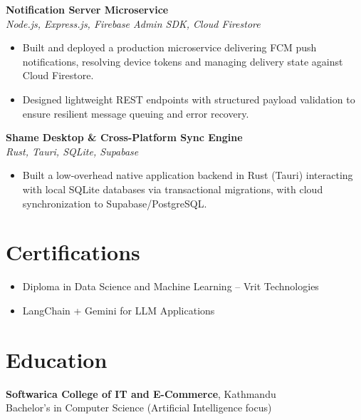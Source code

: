 \documentclass[a4paper,10pt]{article}
\begin{document}
\vspace{3pt}
\textbf{Notification Server Microservice} \\
\textit{Node.js, Express.js, Firebase Admin SDK, Cloud Firestore}
\begin{itemize}
    \item Built and deployed a production microservice delivering FCM push notifications, resolving device tokens and managing delivery state against Cloud Firestore.
    \item Designed lightweight REST endpoints with structured payload validation to ensure resilient message queuing and error recovery.
\end{itemize}

\vspace{3pt}
\textbf{Shame Desktop \& Cross-Platform Sync Engine} \\
\textit{Rust, Tauri, SQLite, Supabase}
\begin{itemize}
    \item Built a low-overhead native application backend in Rust (Tauri) interacting with local SQLite databases via transactional migrations, with cloud synchronization to Supabase/PostgreSQL.
\end{itemize}

\section*{Certifications}
\begin{itemize}
    \item Diploma in Data Science and Machine Learning -- Vrit Technologies
    \item LangChain + Gemini for LLM Applications
\end{itemize}

\section*{Education}
\textbf{Softwarica College of IT and E-Commerce}, Kathmandu \\
Bachelor's in Computer Science (Artificial Intelligence focus)
\end{document}
